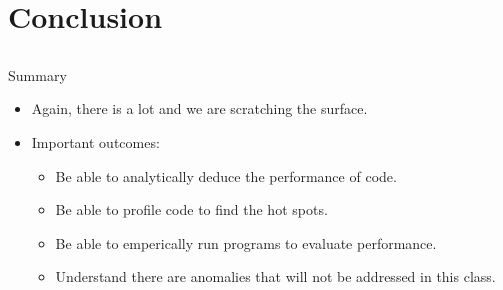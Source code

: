 \documentclass{beamer}
\begin{document}
\section{Conclusion}
\subsection{}

\begin{frame}{Summary}
\begin{itemize}
\item Again, there is a lot and we are scratching the surface.
\item Important outcomes:
\begin{itemize}
\item Be able to analytically deduce the performance of code.
\item Be able to profile code to find the hot spots.
\item Be able to emperically run programs to evaluate performance.
\item Understand there are anomalies that will not be addressed in this class.
\end{itemize}
\end{itemize}
\end{frame}
\end{document}

